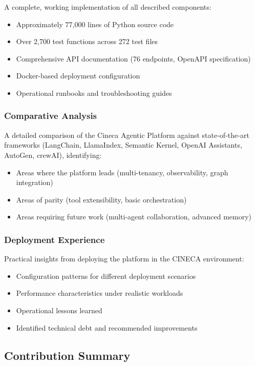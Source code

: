 A complete, working implementation of all described components:
\begin{itemize}
    \item Approximately 77,000 lines of Python source code
    \item Over 2,700 test functions across 272 test files
    \item Comprehensive API documentation (76 endpoints, OpenAPI specification)
    \item Docker-based deployment configuration
    \item Operational runbooks and troubleshooting guides
\end{itemize}

\subsubsection{Comparative Analysis}

A detailed comparison of the Cineca Agentic Platform against state-of-the-art frameworks (LangChain, LlamaIndex, Semantic Kernel, OpenAI Assistants, AutoGen, crewAI), identifying:
\begin{itemize}
    \item Areas where the platform leads (multi-tenancy, observability, graph integration)
    \item Areas of parity (tool extensibility, basic orchestration)
    \item Areas requiring future work (multi-agent collaboration, advanced memory)
\end{itemize}

\subsubsection{Deployment Experience}

Practical insights from deploying the platform in the CINECA environment:
\begin{itemize}
    \item Configuration patterns for different deployment scenarios
    \item Performance characteristics under realistic workloads
    \item Operational lessons learned
    \item Identified technical debt and recommended improvements
\end{itemize}

\subsection{Contribution Summary}

